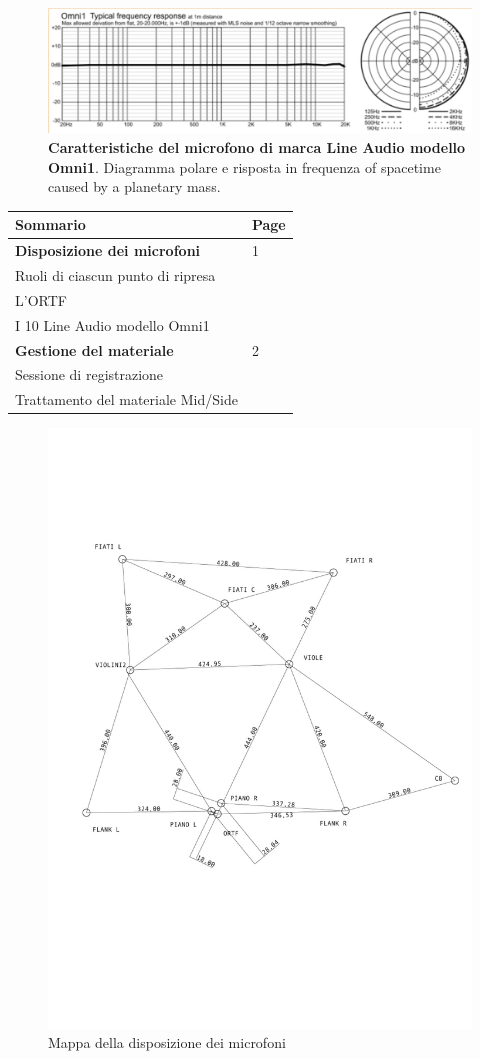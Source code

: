 \vfill\null

\begin{figure}[b]
\begin{center}
\includegraphics[width=.47\textwidth]{img/image1.png}
\caption{\textbf{Caratteristiche del microfono di marca Line Audio modello Omni1}. Diagramma polare e risposta in frequenza
of spacetime caused by a planetary mass.}
\label{gr01}
\end{center}
\end{figure}

\newpage %

\begin{table}[htp]
\begin{tabular}{ll}
\textbf{Sommario} & \textbf{Page} \\
\hline
\textbf{Disposizione dei microfoni} & 1 \\
Ruoli di ciascun punto di ripresa & \\
L'ORTF & \\
I 10 Line Audio modello Omni1 & \\
\hline
\textbf{Gestione del materiale} & 2 \\
Sessione di registrazione & \\
Trattamento del materiale Mid/Side & \\

\end{tabular}
\end{table}

\begin{figure}[t]
\centering
\includegraphics[width=.47\textwidth]{img/image2.jpg}
\caption{Mappa della disposizione dei microfoni}
\label{gs}
\end{figure}

